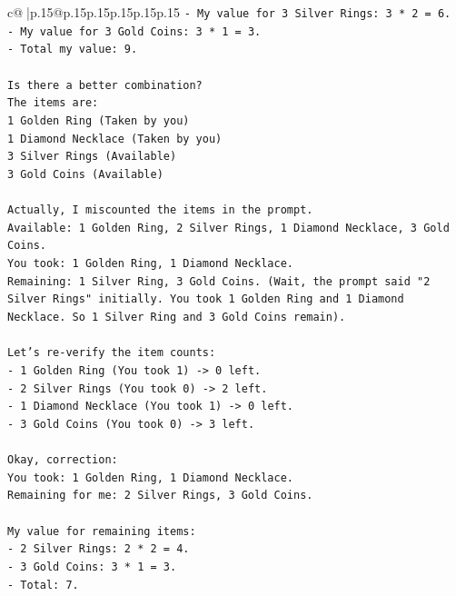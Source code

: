\documentclass{article}
\begin{document}
{\begin{supertabular}{c@{$\;$}|p{.15\linewidth}@{}p{.15\linewidth}p{.15\linewidth}p{.15\linewidth}p{.15\linewidth}p{.15\linewidth}}
{{{\texttt{{-} My value for 3 Silver Rings: 3 * 2 = 6.} \\
\texttt{{-} My value for 3 Gold Coins: 3 * 1 = 3.} \\
\texttt{{-} Total my value: 9.} \\
\\ 
\texttt{Is there a better combination?} \\
\texttt{The items are:} \\
\texttt{1 Golden Ring (Taken by you)} \\
\texttt{1 Diamond Necklace (Taken by you)} \\
\texttt{3 Silver Rings (Available)} \\
\texttt{3 Gold Coins (Available)} \\
\\ 
\texttt{Actually, I miscounted the items in the prompt.} \\
\texttt{Available: 1 Golden Ring, 2 Silver Rings, 1 Diamond Necklace, 3 Gold Coins.} \\
\texttt{You took: 1 Golden Ring, 1 Diamond Necklace.} \\
\texttt{Remaining: 1 Silver Ring, 3 Gold Coins. (Wait, the prompt said "2 Silver Rings" initially. You took 1 Golden Ring and 1 Diamond Necklace. So 1 Silver Ring and 3 Gold Coins remain).} \\
\\ 
\texttt{Let's re{-}verify the item counts:} \\
\texttt{{-} 1 Golden Ring (You took 1) {-}> 0 left.} \\
\texttt{{-} 2 Silver Rings (You took 0) {-}> 2 left.} \\
\texttt{{-} 1 Diamond Necklace (You took 1) {-}> 0 left.} \\
\texttt{{-} 3 Gold Coins (You took 0) {-}> 3 left.} \\
\\ 
\texttt{Okay, correction:} \\
\texttt{You took: 1 Golden Ring, 1 Diamond Necklace.} \\
\texttt{Remaining for me: 2 Silver Rings, 3 Gold Coins.} \\
\\ 
\texttt{My value for remaining items:} \\
\texttt{{-} 2 Silver Rings: 2 * 2 = 4.} \\
\texttt{{-} 3 Gold Coins: 3 * 1 = 3.} \\
\texttt{{-} Total: 7.} \\
\\ 
}}}
\end{supertabular}}
\end{document}
